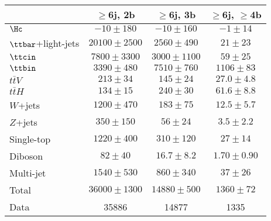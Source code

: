 \begin{table}[htbp]
\begin{center}
\begin{tabular}{l*{3}{c}}
\hline\hline
 & $\geq$6j, 2b & $\geq$6j, 3b & $\geq$6j, $\geq$4b \\
\hline
$\Hc$  &   $ -10 \pm 180 $ &   $ -10 \pm 160 $ &   $ -1 \pm 14 $ \\ 
\hline
$\ttbar$+light-jets  &   $ 20100 \pm 2500 $ &   $ 2560 \pm 490 $ &   $ 21 \pm 23 $ \\ 
$\ttcin$  &   $ 7800 \pm 3300 $ &   $ 3000 \pm 1100 $ &   $ 59 \pm 25 $ \\ 
$\ttbin$  &   $ 3390 \pm 480 $ &   $ 7510 \pm 760 $ &   $ 1106 \pm 83 $ \\ 
$t\bar{t}V$  &   $ 213 \pm 34 $ &   $ 145 \pm 24 $ &   $ 27.0 \pm 4.8 $ \\ 
$t\bar{t}H$  &   $ 134 \pm 15 $ &   $ 240 \pm 30 $ &   $ 61.6 \pm 8.8 $ \\ 
$W$+jets  &   $ 1200 \pm 470 $ &   $ 183 \pm 75 $ &   $ 12.5 \pm 5.7 $ \\ 
$Z$+jets  &   $ 350 \pm 150 $ &   $ 56 \pm 24 $ &   $ 3.5 \pm 2.2 $ \\ 
Single-top  &   $ 1220 \pm 400 $ &   $ 310 \pm 120 $ &   $ 27 \pm 14 $ \\ 
Diboson  &   $ 82 \pm 40 $ &   $ 16.7 \pm 8.2 $ &   $ 1.70 \pm 0.90 $ \\ 
Multi-jet  &   $ 1540 \pm 530 $ &   $ 860 \pm 340 $ &   $ 37 \pm 26 $ \\ 
\hline
Total &   $ 36000 \pm 1300 $ &   $ 14880 \pm 500 $ &   $ 1360 \pm 72 $ \\ 
\hline
Data & 35886  & 14877  & 1335  \\
\hline\hline      
\end{tabular}
%
\end{center}
\label{tab:Hbb_Postfit_Yields_Unblind_Hc}
\end{table}

